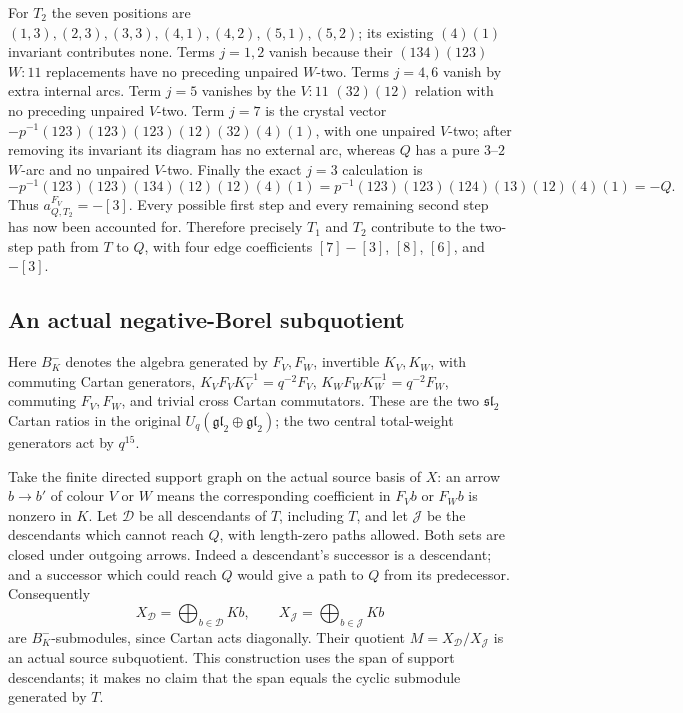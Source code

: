 For $T_2$ the seven positions are
$(1,3),(2,3),(3,3),(4,1),(4,2),(5,1),(5,2)$; its existing
$(4)(1)$ invariant contributes none. Terms $j=1,2$ vanish because
their $(134)(123)$ $W:11$ replacements have no preceding unpaired
$W$-two. Terms $j=4,6$ vanish by extra internal arcs. Term $j=5$
vanishes by the $V:11$ $(32)(12)$ relation with no preceding
unpaired $V$-two. Term $j=7$ is the crystal vector
$-p^{-1}(123)(123)(123)(12)(32)(4)(1)$, with one unpaired
$V$-two; after removing its invariant its diagram has no external
arc, whereas $Q$ has a pure $3$--$2$ $W$-arc and no unpaired
$V$-two. Finally the exact $j=3$ calculation is
\[
 -p^{-1}(123)(123)(134)(12)(12)(4)(1)
 =p^{-1}(123)(123)(124)(13)(12)(4)(1)=-Q.
\]
Thus $a^{F_V}_{Q,T_2}=-[3]$. Every possible first step and every
remaining second step has now been accounted for. Therefore precisely
$T_1$ and $T_2$ contribute to the two-step path from $T$ to $Q$,
with four edge coefficients $[7]-[3]$, $[8]$, $[6]$, and $-[3]$.


\subsection{An actual negative-Borel subquotient}

Here $B^-_K$ denotes the algebra generated by $F_V,F_W$, invertible
$K_V,K_W$, with commuting Cartan generators,
$K_VF_VK_V^{-1}=q^{-2}F_V$,
$K_WF_WK_W^{-1}=q^{-2}F_W$, commuting $F_V,F_W$, and trivial cross
Cartan commutators. These are the two $\mathfrak{sl}_2$ Cartan
ratios in the original $U_q(\mathfrak{gl}_2\oplus\mathfrak{gl}_2)$;
the two central total-weight generators act by $q^{15}$.

Take the finite directed support graph on the actual source basis of
$X$: an arrow $b\to b'$ of colour $V$ or $W$ means the corresponding
coefficient in $F_Vb$ or $F_Wb$ is nonzero in $K$. Let $\mathcal D$
be all descendants of $T$, including $T$, and let $\mathcal J$ be
the descendants which cannot reach $Q$, with length-zero paths allowed.
Both sets are closed under outgoing arrows. Indeed a descendant's
successor is a descendant; and a successor which could reach $Q$
would give a path to $Q$ from its predecessor. Consequently
\[
 X_{\mathcal D}=\bigoplus_{b\in\mathcal D}Kb,
 \qquad X_{\mathcal J}=\bigoplus_{b\in\mathcal J}Kb
\]
are $B^-_K$-submodules, since Cartan acts diagonally. Their quotient
$M=X_{\mathcal D}/X_{\mathcal J}$ is an actual source subquotient.
This construction uses the span of support descendants; it makes no
claim that the span equals the cyclic submodule generated by $T$.

